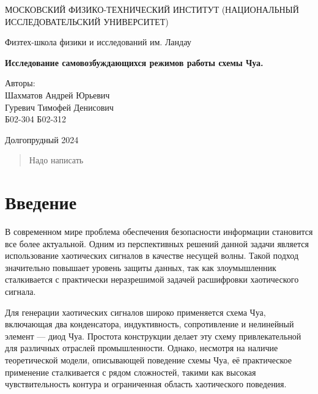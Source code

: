 \documentclass[12pt]{article}
\date{\today}
\begin{document}
\begin{titlepage}
	\begin{center}
		{\large МОСКОВСКИЙ ФИЗИКО-ТЕХНИЧЕСКИЙ ИНСТИТУТ (НАЦИОНАЛЬНЫЙ ИССЛЕДОВАТЕЛЬСКИЙ УНИВЕРСИТЕТ)}
	\end{center}
	\begin{center}
		{\large Физтех-школа физики и исследований им. Ландау}
	\end{center}

	\vspace{3cm}
	{\huge
		\begin{center}
			\textbf{Исследование самовозбуждающихся режимов работы схемы Чуа.}
		\end{center}
	}
	\vspace{2cm}
	\begin{flushright}
		{\LARGE Авторы:\\ Шахматов Андрей Юрьевич \\ Гуревич Тимофей Денисович \\ 
			\vspace{0.2cm}
			Б02-304 \vspace{0.2cm} Б02-312}
	\end{flushright}
	\vspace{7 cm}
	\begin{center}
		Долгопрудный 2024
	\end{center}
	\thispagestyle{empty}
\end{titlepage}


\begin{abstract}
	Надо написать
\end{abstract}


\section*{Введение} 
В современном мире проблема обеспечения безопасности информации становится все более актуальной.
Одним из перспективных решений данной задачи является использование хаотических сигналов в качестве несущей волны.
Такой подход значительно повышает уровень защиты данных,
так как злоумышленник сталкивается с практически неразрешимой задачей расшифровки хаотического сигнала.

Для генерации хаотических сигналов широко применяется схема Чуа, включающая два конденсатора,
индуктивность, сопротивление и нелинейный элемент --- диод Чуа.
Простота конструкции делает эту схему привлекательной для различных отраслей промышленности.
Однако, несмотря на наличие теоретической модели, описывающей поведение схемы Чуа,
её практическое применение сталкивается с рядом сложностей, такими как высокая чувствительность контура и
ограниченная область хаотического поведения.
\end{document}
